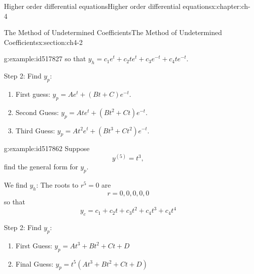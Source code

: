 \documentclass[oneside,10pt,]{book}
\numberwithin{equation}{section}
\numberwithin{equation}{section}
\begin{document}
\begin{chapterptx}{Higher order differential equations}{}{Higher order differential equations}{}{}{x:chapter:ch-4}
\begin{sectionptx}{The Method of Undetermined Coefficients}{}{The Method of Undetermined Coefficients}{}{}{x:section:ch4-2}
\begin{example}{}{g:example:id517827}
so that \(y_{h}=c_{1}e^{t}+c_{2}te^{t}+c_{3}e^{-t}+c_{4}te^{-t}\).%
\par
Step 2: Find \(y_{p}\):%
\begin{enumerate}
\item{}First guess: \(y_{p}=Ae^{t}+\left(Bt+C\right)e^{-t}\).%
\item{}Second Guess: \(y_{p}=Ate^{t}+\left(Bt^{2}+Ct\right)e^{-t}\).%
\item{}Third Guess: \(y_{p}=At^{2}e^{t}+\left(Bt^{3}+Ct^{2}\right)e^{-t}\).%
\end{enumerate}
%
\end{example}
\begin{example}{}{g:example:id517862}%
Suppose%
\begin{equation*}
y^{(5)}=t^{3},
\end{equation*}
find the general form for \(y_{p}\).%
\par
We find \(y_{h}\): The roots to \(r^{5}=0\) are%
\begin{equation*}
r=0,0,0,0,0
\end{equation*}
so that%
\begin{equation*}
y_{c} =c_{1}+c_{2}t+c_{3}t^{2}+c_{4}t^{3}+c_{4}t^{4}
\end{equation*}
%
\par
Step 2: Find \(y_{p}\):%
\begin{enumerate}
\item{}First Guess: \(y_{p}=At^{3}+Bt^{2}+Ct+D\)%
\item{}Final Guess:\textbraceright{}\textbraceright{} \(y_{p}=t^{5}\left(At^{3}+Bt^{2}+Ct+D\right)\)%
\end{enumerate}
%
\end{example}
\end{sectionptx}
\end{chapterptx}
%
%
\typeout{************************************************}
\typeout{************************************************}
%
\end{document}
